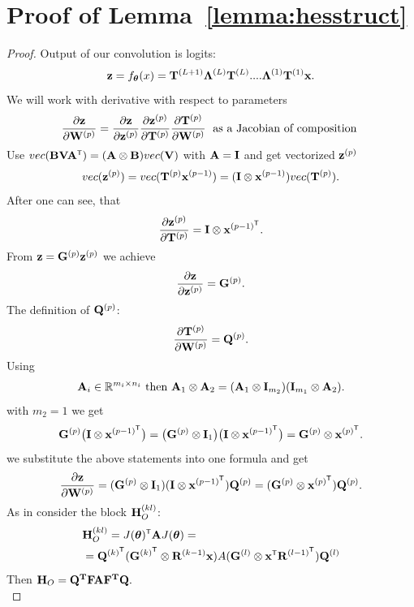 \documentclass[conference]{IEEEtran}
\begin{document}




\appendices

\section{Proof of Lemma~\ref{lemma:hesstruct}}\label{app:lemma:hesstruct}
\begin{proof}
Output of our convolution is logits:
\[\mathbf{z} = f_{\boldsymbol{\theta}}(x) = \mathbf{T}^{(L+1)}\boldsymbol{\Lambda}^{(L)}\mathbf{T}^{(L)}....\boldsymbol{\Lambda}^{(1)}\mathbf{T}^{(1)}\mathbf{x}.\]
We will work with derivative with respect to parameters
\begin{align*}
 \frac{\partial \mathbf{z}}{\partial \mathbf{W}^{(p)}} = \frac{\partial \mathbf{z}}{\partial \mathbf{z}^{(p)}}\frac{\partial \mathbf{z}^{(p)}}{\partial \mathbf{T}^{(p)}}\frac{\partial \mathbf{T}^{(p)}}{\partial \mathbf{W}^{(p)}} \;\text{ as a Jacobian of composition }
\end{align*}
Use $vec(\bB\bV\bA\T) = (\bA \otimes \bB)vec(\bV)$ with $\mathbf{A} = \mathbf{I}$ and get vectorized $\mathbf{z}^{(p)}$ 
\[vec(\mathbf{z}^{(p)}) = vec(\mathbf{T}^{(p)}\mathbf{x}^{(p-1)}) = (\mathbf{I} \otimes \mathbf{x}^{(p-1)})vec(\mathbf{T}^{(p)}).\]
After one can see, that 
\[\frac{\partial \bz^{(p)}}{\partial \bT^{(p)}} = \bI \otimes \bx^{(p-1)\T}.\]
From $\mathbf{z} = \mathbf{G}^{(p)}\mathbf{z}^{(p)}$ we achieve
\[\frac{\partial \mathbf{z}}{\partial \mathbf{z}^{(p)}} = \mathbf{G}^{(p)}.\]
The definition of $\mathbf{Q}^{(p)}$: \\
\[\frac{\partial\mathbf{T}^{(p)}}{\partial\mathbf{W}^{(p)}} = {\mathbf{Q}}^{(p)}.\]
Using 
\[\mathbf{A}_i \in \mathbb{R}^{m_i \times n_i} \text{ then } \mathbf{A}_1 \otimes \mathbf{A}_2 = (\mathbf{A}_1 \otimes \mathbf{I}_{m_2})(\mathbf{I}_{m_1} \otimes \mathbf{A}_2).\]
with $m_2 = 1$ we get
\[\bG^{(p)}\big(\bI \otimes \bx^{(p-1)\T}\big) = \big(\bG^{(p)} \otimes \bI_1\big)\big(\bI \otimes \bx^{(p-1)\T}\big) = \bG^{(p)} \otimes \bx^{(p)\T}.\]
we substitute the above statements into one formula and get
\[\frac{\partial \bz}{\partial \bW^{(p)}} = (\bG^{(p)} \otimes \bI_1)(\bI \otimes \bx^{(p-1)\T})\bQ^{(p)} = (\bG^{(p)} \otimes \bx^{(p)\T})\bQ^{(p)}.\]
As in \cite{singh2023hessianperspectivenatureconvolutional} consider the block $\mathbf{H}_O^{(kl)}$:
\begin{align*}
& \bH_O^{(kl)} = J(\btheta)\T \bA J(\btheta) = \\
& = \bQ^{(k)\T}(\bG^{(k)\T} \otimes \bR^{(k-1)}\bx)A(\bG^{(l)} \otimes \bx\T\bR^{(l-1)\T})\bQ^{(l)}
\end{align*}
Then $\mathbf{H}_O = \mathbf{Q}^{\mathbf{T}}\mathbf{F}\mathbf{A}\mathbf{F}^{\mathbf{T}}\mathbf{Q}.$ \\
\end{proof}
\end{document}

